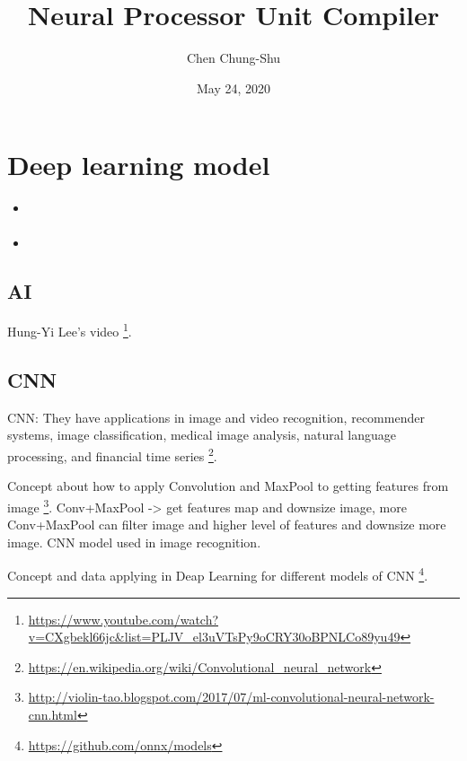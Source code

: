 \documentclass[letterpaper,10pt,english]{sphinxmanual}
\title{Neural Processor Unit Compiler}
\date{May 24, 2020}
\author{Chen Chung-Shu}
\begin{document}
\maketitle
\tableofcontents
{}\label{index::doc}



\chapter{Deep learning model}
\label{model::doc}\label{model:deep-learning-model}\label{model:table-of-contents}\label{model:sec-model}
\begin{SphinxShadowBox}
\begin{itemize}
\item {} 
\label{model:id5}{\hyperref[model:ai]{}}

\item {} 
\label{model:id6}{\hyperref[model:cnn]{}}

\end{itemize}
\end{SphinxShadowBox}


\section{AI}
\label{model:ai}
Hung-Yi Lee's video \footnote[1]{\sphinxAtStartFootnote%
\url{https://www.youtube.com/watch?v=CXgbekl66jc\&list=PLJV\_el3uVTsPy9oCRY30oBPNLCo89yu49}
}.


\section{CNN}
\label{model:cnn}
CNN: They have applications in image and video recognition, recommender systems,
image classification, medical image analysis, natural language processing, and
financial time series \footnote[4]{\sphinxAtStartFootnote%
\url{https://en.wikipedia.org/wiki/Convolutional\_neural\_network}
}.

Concept about how to apply Convolution and MaxPool to getting features from image \footnote[2]{\sphinxAtStartFootnote%
\url{http://violin-tao.blogspot.com/2017/07/ml-convolutional-neural-network-cnn.html}
}.
Conv+MaxPool -\textgreater{} get features map and downsize image, more Conv+MaxPool can filter image and higher
level of features and downsize more image. CNN model used in image recognition.

Concept and data applying in Deap Learning for different models of CNN \footnote[3]{\sphinxAtStartFootnote%
\url{https://github.com/onnx/models}
}.
\end{document}
